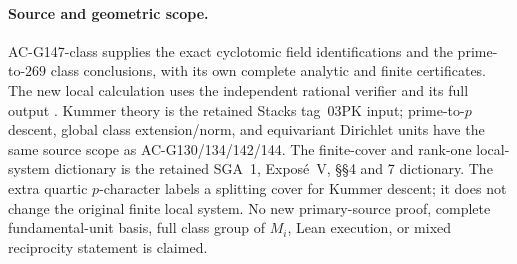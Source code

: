 \paragraph{Source and geometric scope.}
AC-G147-class supplies the exact cyclotomic field identifications
and the prime-to-$269$ class conclusions, with its own complete
analytic and finite certificates.
The new local calculation uses the independent rational verifier
 and its full output
.
Kummer theory is the retained Stacks tag~03PK input;
prime-to-$p$ descent, global class extension/norm, and equivariant
Dirichlet units have the same source scope as AC-G130/134/142/144.
The finite-cover and rank-one local-system dictionary is the
retained SGA~1, Expos\'e~V, \S\S4 and 7 dictionary.
The extra quartic $p$-character labels a splitting cover for
Kummer descent; it does not change the original finite local system.
No new primary-source proof, complete fundamental-unit basis,
full class group of $M_i$, Lean execution, or mixed reciprocity
statement is claimed.
